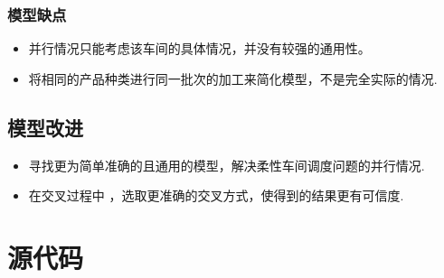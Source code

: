 \documentclass{whutmod}
\begin{document}
\begin{spacing}{1.2}
   \subsubsection{模型缺点}
	\begin{itemize}
	    \item 并行情况只能考虑该车间的具体情况，并没有较强的通用性。
	    
	    \item 将相同的产品种类进行同一批次的加工来简化模型，不是完全实际的情况.
	\end{itemize}
	\subsection{模型改进}
	  \begin{itemize}
	      \item 寻找更为简单准确的且通用的模型，解决柔性车间调度问题的并行情况.
	      
	     \item 在交叉过程中 ，选取更准确的交叉方式，使得到的结果更有可信度.
	  \end{itemize}
    
	\clearpage





\clearpage

\appendix %



    
\section{源代码}

\end{spacing}
\end{document}
